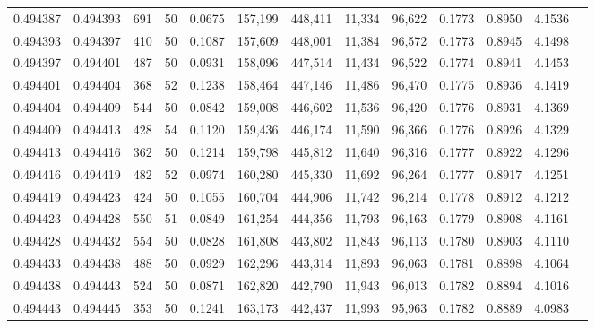 \begin{tabular}{rrrrrrrrrrrrr}
0.494387 & 0.494393 &   691 &  50 &                                     0.0675 & 157,199 & 448,411 &  11,334 &  96,622 & 0.1773 & 0.8950 & 4.1536 \\
0.494393 & 0.494397 &   410 &  50 &                                     0.1087 & 157,609 & 448,001 &  11,384 &  96,572 & 0.1773 & 0.8945 & 4.1498 \\
0.494397 & 0.494401 &   487 &  50 &                                     0.0931 & 158,096 & 447,514 &  11,434 &  96,522 & 0.1774 & 0.8941 & 4.1453 \\
0.494401 & 0.494404 &   368 &  52 &                                     0.1238 & 158,464 & 447,146 &  11,486 &  96,470 & 0.1775 & 0.8936 & 4.1419 \\
0.494404 & 0.494409 &   544 &  50 &                                     0.0842 & 159,008 & 446,602 &  11,536 &  96,420 & 0.1776 & 0.8931 & 4.1369 \\
0.494409 & 0.494413 &   428 &  54 &                                     0.1120 & 159,436 & 446,174 &  11,590 &  96,366 & 0.1776 & 0.8926 & 4.1329 \\
0.494413 & 0.494416 &   362 &  50 &                                     0.1214 & 159,798 & 445,812 &  11,640 &  96,316 & 0.1777 & 0.8922 & 4.1296 \\
0.494416 & 0.494419 &   482 &  52 &                                     0.0974 & 160,280 & 445,330 &  11,692 &  96,264 & 0.1777 & 0.8917 & 4.1251 \\
0.494419 & 0.494423 &   424 &  50 &                                     0.1055 & 160,704 & 444,906 &  11,742 &  96,214 & 0.1778 & 0.8912 & 4.1212 \\
0.494423 & 0.494428 &   550 &  51 &                                     0.0849 & 161,254 & 444,356 &  11,793 &  96,163 & 0.1779 & 0.8908 & 4.1161 \\
0.494428 & 0.494432 &   554 &  50 &                                     0.0828 & 161,808 & 443,802 &  11,843 &  96,113 & 0.1780 & 0.8903 & 4.1110 \\
0.494433 & 0.494438 &   488 &  50 &                                     0.0929 & 162,296 & 443,314 &  11,893 &  96,063 & 0.1781 & 0.8898 & 4.1064 \\
0.494438 & 0.494443 &   524 &  50 &                                     0.0871 & 162,820 & 442,790 &  11,943 &  96,013 & 0.1782 & 0.8894 & 4.1016 \\
0.494443 & 0.494445 &   353 &  50 &                                     0.1241 & 163,173 & 442,437 &  11,993 &  95,963 & 0.1782 & 0.8889 & 4.0983 \\

\end{tabular}
